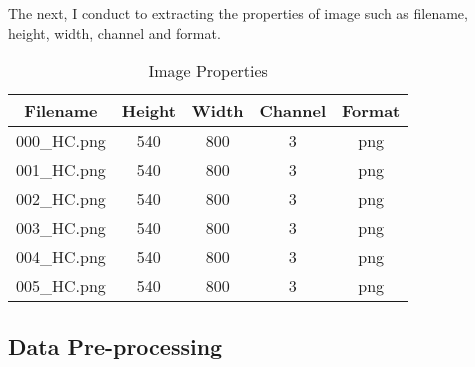 \documentclass[10pt, conference]{IEEEtran}
\begin{document}
	The next, I conduct to extracting the properties of image such as filename, height, width, channel and format.
	
	\begin{table}[h]
		\centering
		\begin{tabular}{|c|c|c|c|c|}
			\hline
			\textbf{Filename} & \textbf{Height} & \textbf{Width} & \textbf{Channel} & \textbf{Format} \\ \hline
			000\_HC.png & 540 & 800 & 3 & png \\ \hline
			001\_HC.png & 540 & 800 & 3 & png \\ \hline
			002\_HC.png & 540 & 800 & 3 & png \\ \hline
			003\_HC.png & 540 & 800 & 3 & png \\ \hline
			004\_HC.png & 540 & 800 & 3 & png \\ \hline
			005\_HC.png & 540 & 800 & 3 & png \\ \hline
			
		\end{tabular}
		\caption{Image Properties}
		\label{tab:properties}
	\end{table}
	
	\subsection{Data Pre-processing}
\end{document}
